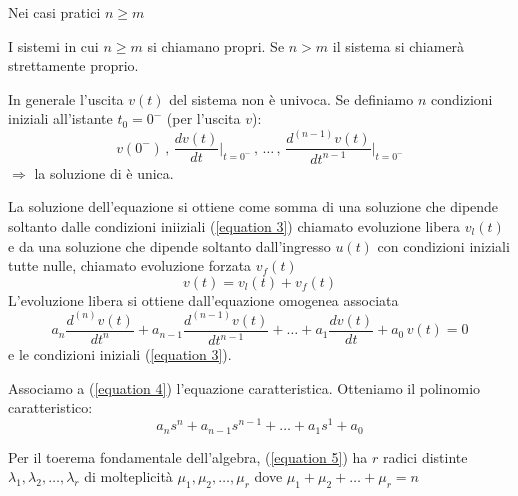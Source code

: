 \begin{oss}
	Nei casi pratici $n \ge m$	
\end{oss}

\begin{definition}
	I sistemi in cui $n \ge m$ si chiamano propri. Se $n > m$ il sistema si chiamerà strettamente proprio.
\end{definition}

\begin{oss}
	In generale l'uscita $v(t)$ del sistema %
	non è univoca. Se definiamo $n$ condizioni iniziali all'istante $t_0 = 0^-$ (per l'uscita $v$):
	\begin{equation}
		v(0^-) \,
		,\, \frac{dv(t)}{dt}\bigg\vert_{t=0^-} \,
		,\, \dots\,
		,\, \frac{d^{(n-1)}v(t)}{dt^{n-1}}\bigg\vert_{t=0^-}
		\tag{3}\label{equation 3}
	\end{equation}
	$\Rightarrow$ la soluzione di %
	è unica.
\end{oss}

La soluzione dell'equazione %
si ottiene come somma di una soluzione che dipende soltanto dalle condizioni iniiziali (\ref{equation 3}) chiamato evoluzione libera $v_l(t)$ e da una soluzione che dipende soltanto dall'ingresso $u(t)$ con condizioni iniziali tutte nulle, chiamato evoluzione forzata $v_f(t)$ %
\[
v(t) = v_l(t) + v_f(t)
\]
L'evoluzione libera si ottiene dall'equazione omogenea associata
\begin{equation}
	a_n \frac{d^{(n)} v(t)}{dt^n} 
		+ a_{n-1} \frac{d^{(n-1)} v(t)}{dt^{n-1}} 
		+ \dots 
		+ a_1 \frac{dv(t)}{dt} 
		+ a_0\,v(t)
	= 0
	\tag{4}\label{equation 4}
\end{equation}
e le condizioni iniziali (\ref{equation 3}).

Associamo a (\ref{equation 4}) l'equazione caratteristica. Otteniamo il polinomio caratteristico: %
\begin{equation}
	a_n s^n 
	+ a_{n-1} s^{n-1}
	+ \dots
	+ a_1 s^1
	+ a_0
	\tag{5}\label{equation 5}
\end{equation}

Per il toerema fondamentale dell'algebra, (\ref{equation 5}) ha $r$ radici  distinte $\lambda_1,\lambda_2, \dots, \lambda_r$ di molteplicità $\mu_1, \mu_2, \dots,\mu_r$ dove  $\mu_1 +\mu_2 + \dots + \mu_r = n$

